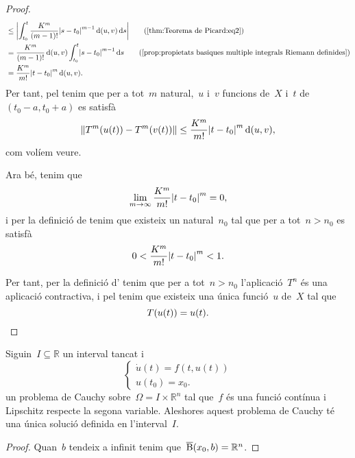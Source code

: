\documentclass[../../main.tex]{subfiles}
\begin{document}
\begin{theorem}
\begin{proof}
\begin{align*}
				&\leq\abs{\int_{t_{0}}^{t}\frac{K^{m}}{(m-1)!}\abs{s-t_{0}}^{m-1}\distancia(u,v)\diff s}\tag{\ref{thm:Teorema de Picard:eq2}}\\
				&=\frac{K^{m}}{(m-1)!}\distancia(u,v)\int_{t_{0}}^{t}\abs{s-t_{0}}^{m-1}\diff s\tag{\ref{prop:propietats basiques multiple integrals Riemann definides}}\\
				&=\frac{K^{m}}{m!}\abs{t-t_{0}}^{m}\distancia(u,v).%
			\end{align*}
			Per tant, pel  tenim que per a tot~\(m\) natural,~\(u\) i~\(v\) funcions de~\(X\) i~\(t\) de~\((t_{0}-a,t_{0}+a)\) es satisfà
			\[
			    \norm{T^{m}(u(t))-T^{m}(v(t))}\leq\frac{K^{m}}{m!}\abs{t-t_{0}}^{m}\distancia(u,v),
			\]
			com volíem veure.

			Ara bé, tenim que
			\[
			    \lim_{m\to\infty}\frac{K^{m}}{m!}\abs{t-t_{0}}^{m}=0,
			\]%
			i per la definició de  tenim que existeix un natural~\(n_{0}\) tal que per a tot~\(n>n_{0}\) es satisfà
			\[
			    0<{\frac{K^{m}}{m!}\abs{t-t_{0}}^{m}}<1.
			\]

			Per tant, per la definició d' tenim que per a tot~\(n>n_{0}\) l'aplicació~\(T^{n}\) és una aplicació contractiva, i pel \corollari{}  tenim que existeix una única funció~\(u\) de~\(X\) tal que
			\[
			    T(u(t))=u(t).\qedhere
			\]
		\end{proof}
	\end{theorem}
	\begin{corollary}
		\label{cor:Teorema de Picard}
		Siguin~\(I\subseteq\mathbb{R}\) un interval tancat i
		\[\begin{cases}
			\displaystyle \dot{u}(t)=f(t,u(t)) \\
			\displaystyle u(t_{0})=x_{0}.
		\end{cases}\]
		un problema de Cauchy sobre~\(\Omega=I\times\mathbb{R}^{n}\) tal que~\(f\) és una funció contínua i Lipschitz respecte la segona variable.
		Aleshores aquest problema de Cauchy té una única solució definida en l'interval~\(I\).
		\begin{proof}
			Quan~\(b\) tendeix a infinit tenim que~\(\overline{\operatorname{B}}(x_{0},b)=\mathbb{R}^{n}\).
		\end{proof}
	\end{corollary}
\end{document}
